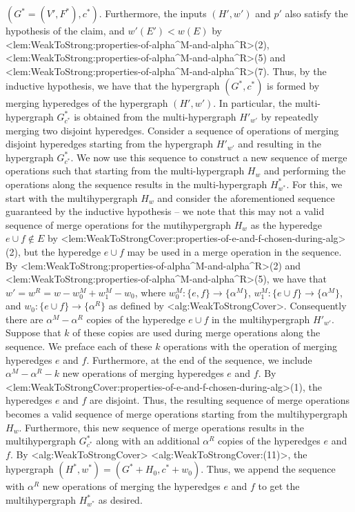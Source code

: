 \documentclass{article}
\def\Cref#1{<#1>}%
\begin{document}
    
    $(G^* = (V', F^*), c^*)$. Furthermore, the inputs 
$(H', w')$ and $p'$ also satisfy the hypothesis of the claim, and $w'(E') < w(E)$ by \Cref{lem:WeakToStrong:properties-of-alpha^M-and-alpha^R}(2), \Cref{lem:WeakToStrong:properties-of-alpha^M-and-alpha^R}(5) and \Cref{lem:WeakToStrong:properties-of-alpha^M-and-alpha^R}(7). Thus, by the inductive hypothesis, we have that the hypergraph $(G^*, c^*)$ is formed by merging hyperedges of the hypergraph $(H', w')$. In particular, the multi-hypergraph $G^*_{c^*}$ is obtained from the multi-hypergraph $H'_{w'}$ by repeatedly merging two disjoint hyperedges. Consider a sequence of operations of merging disjoint hyperedges starting from the hypergraph $H'_{w'}$ and resulting in the hypergraph $G^*_{c^*}$. We now use this sequence to construct a new sequence of merge operations such that starting from the multi-hypergraph $H_w$ and performing the operations along the sequence results in the multi-hypergraph $H^*_{w^*}$. For this, we start with the multihypergraph $H_w$ and consider the aforementioned sequence guaranteed by the inductive hypothesis  --  we note that this may not a valid sequence of merge operations for the mutihypergraph $H_w$ as the hyperedge $e\cup f \not \in E$ by \Cref{lem:WeakToStrongCover:properties-of-e-and-f-chosen-during-alg}(2), but the hyperedge $e\cup f$ may be used in a merge operation in the sequence. By \Cref{lem:WeakToStrong:properties-of-alpha^M-and-alpha^R}(2) and \Cref{lem:WeakToStrong:properties-of-alpha^M-and-alpha^R}(5), we have that $w' = w^R = w - w_0^M + w_1^M - w_0$, where $w_0^M:\{e, f\}\rightarrow\{\alpha^M\}$, $w_1^M:\{e\cup f\} \rightarrow\{\alpha^M\}$, and $w_0:\{e\cup f\}\rightarrow\{\alpha^R\}$ as defined by \Cref{alg:WeakToStrongCover}. Consequently there are $\alpha^M - \alpha^R$ copies of the hyperedge $e\cup f$ in the multihypergraph $H'_{w'}$. Suppose that $k$ of these copies are used during merge operations along the sequence. We preface each of these $k$ operations with the operation of merging hyperedges $e$ and $f$. Furthermore, at the end of the sequence, we include $\alpha^M - \alpha^R - k$ new operations of merging hyperedges $e$ and $f$. By \Cref{lem:WeakToStrongCover:properties-of-e-and-f-chosen-during-alg}(1), the hyperedges $e$ and $f$ are disjoint. Thus, the resulting sequence of merge operations becomes a valid sequence of merge operations starting from the multihypergraph $H_w$. Furthermore, this new sequence of merge operations results in the multihypergraph $G^*_{c^*}$ along with an additional $\alpha^R$ copies of the hyperedges $e$ and $f$. By \Cref{alg:WeakToStrongCover} \Cref{alg:WeakToStrongCover:(11)}, the hypergraph $(H^*, w^*) = (G^* + H_0, c^* + w_0)$. Thus, we append the sequence with $\alpha^R$ new operations of merging the hyperedges $e$ and $f$ to get the multihypergraph $H^*_{w^*}$ as desired.
\fi
\end{document}
